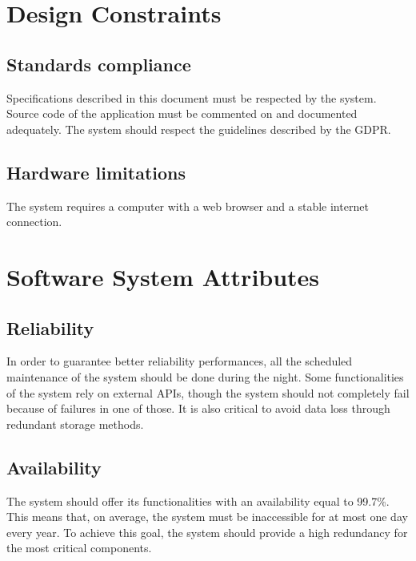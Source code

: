 \section{Design Constraints}

\subsection{Standards compliance}
Specifications described in this document must be respected by the system. Source code of the application
must be commented on and documented adequately. The system should respect the guidelines described
by the GDPR.\\

\subsection{Hardware limitations}
The system requires a computer with a web browser and a stable internet connection.\\


\section{Software System Attributes}

\subsection{Reliability}
In order to guarantee better reliability performances, all the scheduled maintenance of the system should
be done during the night. Some functionalities of the system rely on external APIs, though the system should 
not completely fail because of failures in one of those. It is also critical to avoid data loss through 
redundant storage methods.

\subsection{Availability}
The system should offer its functionalities with an availability equal to 99.7\%. This means that, on average, 
the system must be inaccessible for at most one day every year. To achieve this goal, the system should 
provide a high redundancy for the most critical components.

